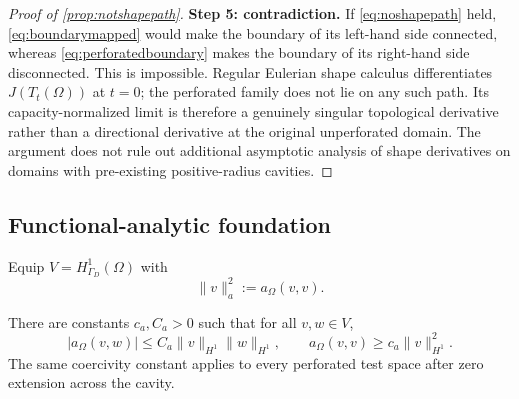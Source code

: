 \begin{proof}[Proof of \cref{prop:notshapepath}]
\textbf{Step 5: contradiction.}
If \cref{eq:noshapepath} held, \cref{eq:boundarymapped} would make the boundary
of its left-hand side connected, whereas \cref{eq:perforatedboundary} makes
the boundary of its right-hand side disconnected.  This is impossible.
Regular Eulerian shape calculus differentiates $J(T_t(\Omega))$ at $t=0$;
the perforated family does not lie on any such path.  Its capacity-normalized
limit is therefore a genuinely singular topological derivative rather than a
directional derivative at the original unperforated domain.  The argument
does not rule out additional asymptotic analysis of shape derivatives on
domains with pre-existing positive-radius cavities.
\end{proof}

\subsection{Functional-analytic foundation}

Equip $V=H^1_{\Gamma_D}(\Omega)$ with
\begin{equation}
 \|v\|_a^2:=a_\Omega(v,v).
 \label{eq:energynorm}
\end{equation}

\begin{proposition}
\label{prop:coercivity}
There are constants $c_a,C_a>0$ such that for all $v,w\in V$,
\begin{equation}
 |a_\Omega(v,w)|\le C_a\|v\|_{H^1}\|w\|_{H^1},
 \qquad
 a_\Omega(v,v)\ge c_a\|v\|_{H^1}^2.
 \label{eq:coercivity}
\end{equation}
The same coercivity constant applies to every perforated test space after
zero extension across the cavity.
\end{proposition}

